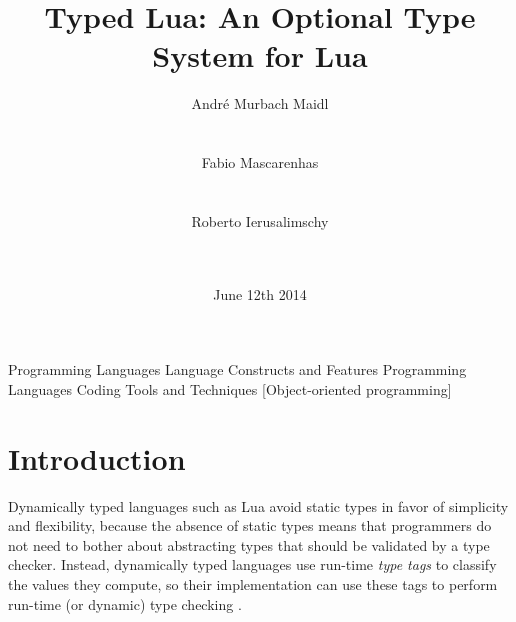 \documentclass[preprint]{sig-alternate}
\begin{document}

\title{Typed Lua: An Optional Type System for Lua}


\author{
\alignauthor
André Murbach Maidl\\
  \\
  \\
\alignauthor
Fabio Mascarenhas\\
  \\
  \\
\alignauthor
Roberto Ierusalimschy\\
  \\
  \\
}

\date{June 12th 2014}

\maketitle

\begin{abstract}
\end{abstract}

         {Programming Languages}
         {Language Constructs and Features}
         {Programming Languages}
         {Coding Tools and Techniques}
         [Object-oriented programming]



\section{Introduction} \label{sec:intro}

Dynamically typed languages such as Lua avoid static types in favor of
simplicity and flexibility, because the absence of static types means
that programmers do not need to bother about abstracting types that
should be validated by a type checker.
Instead, dynamically typed languages use run-time \textit{type tags}
to classify the values they compute, so their implementation can use
these tags to perform run-time (or dynamic) type checking
\citep{pierce2002tpl}.
\end{document}
